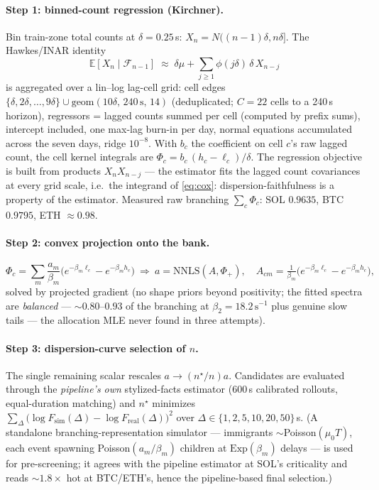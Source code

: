 \documentclass[11pt]{article}
\newcommand{\Fano}{F}
\begin{document}
\paragraph{Step 1: binned-count regression (Kirchner).} Bin train-zone total
counts at $\delta=0.25$\,s: $X_n=N((n{-}1)\delta,n\delta]$. The Hawkes/INAR
identity
\begin{equation}
\mathbb{E}[X_n\mid\mathcal{F}_{n-1}]\;\approx\;\delta\mu+\sum_{j\ge1}\phi(j\delta)\,\delta\,X_{n-j}
\end{equation}
is aggregated over a lin--log lag-cell grid: cell edges
$\{\delta,2\delta,\dots,9\delta\}\cup\mathrm{geom}(10\delta,\,240\,\mathrm{s},\,14)$
(deduplicated; $C=22$ cells to a 240\,s horizon), regressors = lagged counts
summed per cell (computed by prefix sums), intercept included, one max-lag
burn-in per day, normal equations accumulated across the seven days, ridge
$10^{-8}$. With $b_c$ the coefficient on cell $c$'s raw lagged count, the cell
kernel integrals are $\Phi_c=b_c\,(h_c-\ell_c)/\delta$. The regression objective
is built from products $X_nX_{n-j}$ --- the estimator fits the lagged count
covariances at every grid scale, i.e.\ the integrand of \eqref{eq:cox}:
dispersion-faithfulness is a property of the estimator. Measured raw branching
$\sum_c\Phi_c$: SOL $0.9635$, BTC $0.9795$, ETH $\approx0.98$.

\paragraph{Step 2: convex projection onto the bank.}
\begin{equation}
\Phi_c=\sum_m\frac{a_m}{\beta_m}\big(e^{-\beta_m\ell_c}-e^{-\beta_m h_c}\big)
\ \Longrightarrow\ a=\mathrm{NNLS}(A,\Phi_+),\quad
A_{cm}=\tfrac{1}{\beta_m}\big(e^{-\beta_m\ell_c}-e^{-\beta_m h_c}\big),
\end{equation}
solved by projected gradient (no shape priors beyond positivity; the fitted
spectra are \emph{balanced} --- ${\sim}0.80$--$0.93$ of the branching at
$\beta_2=18.2\,\mathrm{s}^{-1}$ plus genuine slow tails --- the allocation MLE
never found in three attempts).

\paragraph{Step 3: dispersion-curve selection of $n$.} The single remaining
scalar rescales $a\to(n^\star/n)a$. Candidates are evaluated through the
\emph{pipeline's own} stylized-facts estimator (600\,s calibrated rollouts,
equal-duration matching) and $n^\star$ minimizes
$\sum_{\Delta}\big(\log \Fano_{\mathrm{sim}}(\Delta)-\log \Fano_{\mathrm{real}}(\Delta)\big)^2$
over $\Delta\in\{1,2,5,10,20,50\}$\,s. (A standalone branching-representation
simulator --- immigrants $\sim$Poisson$(\mu_0 T)$, each event spawning
Poisson$(a_m/\beta_m)$ children at $\mathrm{Exp}(\beta_m)$ delays --- is used
for pre-screening; it agrees with the pipeline estimator at SOL's criticality
and reads ${\sim}1.8\times$ hot at BTC/ETH's, hence the pipeline-based final
selection.)
\end{document}
